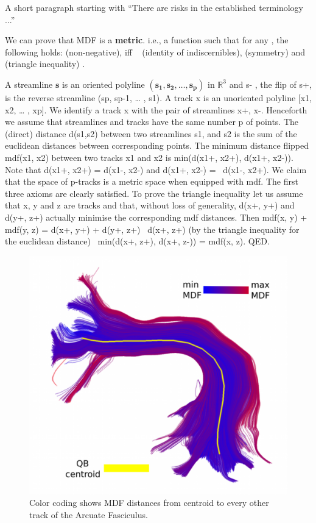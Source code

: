 \documentclass{bioinfo}
\begin{document}
\begin{methods}
A short paragraph starting with “There are risks in the established
terminology ...”  

We can prove that MDF is a \textbf{metric}. i.e., a function such that for any , the following holds:
(non-negative), iff   (identity of indiscernibles), (symmetry) and
(triangle inequality) .  

A streamline $\mathbf{s}$ is an oriented polyline $\mathbf{(s_1, s_2,
  \ldots, s_p)}$ in $\mathbb{R}^3$ and s- , the flip of s+, is the
reverse streamline (sp, sp-1, … , s1). A track x is an unoriented
polyline [x1, x2, … , xp]. We identify a track x with the pair of
streamlines {x+, x-}. Henceforth we assume that streamlines and tracks
have the same number p of points. The (direct) distance d(s1,s2) between
two streamlines s1, and s2 is the sum of the euclidean distances between
corresponding points. The minimum distance flipped mdf(x1, x2) between
two tracks x1 and x2 is min(d(x1+, x2+), d(x1+, x2-)). Note that d(x1+,
x2+) = d(x1-, x2-) and d(x1+, x2-) =  d(x1-, x2+).  We claim that the
space of p-tracks is a metric space when equipped with mdf. The first
three axioms are clearly satisfied. To prove the triangle inequality let
us assume that x, y and z are tracks and that, without loss of
generality, d(x+, y+) and d(y+, z+) actually minimise the corresponding
mdf distances. Then mdf(x, y) + mdf(y, z) = d(x+, y+) + d(y+, z+)  d(x+,
z+) (by the triangle inequality for the euclidean distance)  min(d(x+,
z+), d(x+, z-)) = mdf(x, z). QED.

\begin{figure}
\includegraphics[scale=0.15]{Figures/Fig_11_MDF_arcuate}
\centering{}
\caption{Color coding shows MDF distances from centroid to every other track of the Arcuate Fasciculus.\label{Flo:MDF_arcuate}}
\end{figure}


\end{methods}
\end{document}
